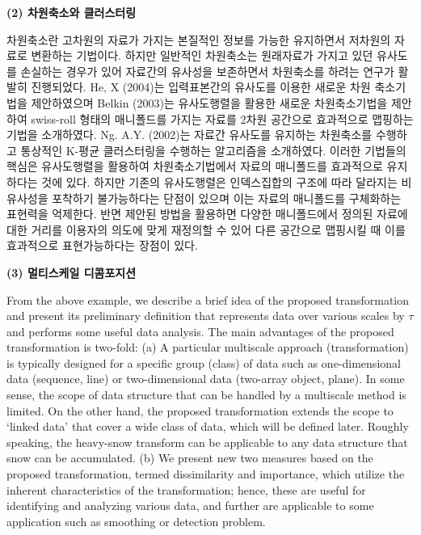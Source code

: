 \documentclass[preprint, review, 12pt]{article}
\theoremstyle{definition}
\theoremstyle{remark}
\begin{document}
\noindent\textbf{(2) 차원축소와 클러스터링}

차원축소란 고차원의 자료가 가지는 본질적인 정보를 가능한 유지하면서 저차원의 자료로 변환하는 기법이다. 하지만 일반적인 차원축소는 원래자료가 가지고 있던 유사도를 손실하는 경우가 있어 자료간의 유사성을 보존하면서 차원축소를 하려는 연구가 활발히 진행되었다. He, X (2004)는 입력표본간의 유사도를 이용한 새로운 차원 축소기법을 제안하였으며 Belkin (2003)는 유사도행렬을 활용한 새로운 차원축소기법을 제안하여 swiss-roll 형태의 매니폴드를 가지는 자료를 2차원 공간으로 효과적으로 맵핑하는 기법을 소개하였다. Ng. A.Y. (2002)는 자료간 유사도를 유지하는 차원축소를 수행하고 통상적인 K-평균 클러스터링을 수행하는 알고리즘을 소개하였다. 이러한 기법들의 핵심은 유사도행렬을 활용하여 차원축소기법에서 자료의 매니폴드를 효과적으로 유지하다는 것에 있다. 하지만 기존의 유사도행렬은 인덱스집합의 구조에 따라 달라지는 비유사성을 포착하기 불가능하다는 단점이 있으며 이는 자료의 매니폴드를 구체화하는 표현력을 억제한다. 반면 제안된 방법을 활용하면 다양한 매니폴드에서 정의된 자료에 대한 거리를 이용자의 의도에 맞게 재정의할 수 있어 다른 공간으로 맵핑시킬 때 이를 효과적으로 표현가능하다는 장점이 있다.

\noindent\textbf{(3) 멀티스케일 디콤포지션} 

From the above example, we describe a brief idea of the proposed transformation and present its preliminary definition that represents data over various scales by $\tau$ and performs some useful data analysis. The main advantages of the proposed transformation is two-fold: (a)  A particular multiscale approach (transformation) is typically designed for a specific group (class) of data such as one-dimensional data (sequence, line) or two-dimensional data (two-array object, plane). In some sense, the scope of data structure that can be handled by a multiscale method is limited. On the other hand, the proposed transformation extends the scope to `linked data' that cover a wide class of data, which will be defined later. Roughly speaking, the heavy-snow transform can be applicable to any data structure that snow can be accumulated. (b) We present new two measures based on the proposed transformation, termed dissimilarity and importance, which utilize the inherent characteristics of the transformation; hence, these are useful for identifying and analyzing various data, and  further are applicable to some application such as smoothing or detection problem.   
\end{document}
